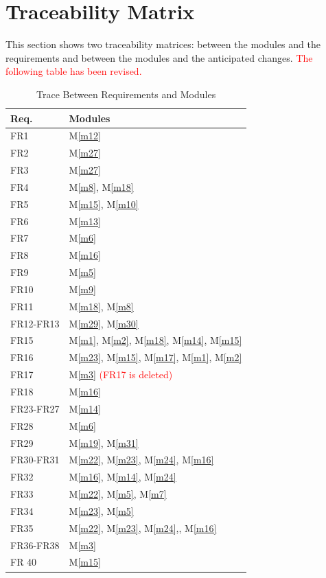\documentclass[12pt]{article}
\newcommand{\mref}[1]{M\ref{#1}}
\begin{document}
\newpage
\section{Traceability Matrix} \label{SecTM}
This section shows two traceability matrices: between the modules and the
requirements and between the modules and the anticipated changes.
\textcolor{red}{The following table has been revised.}
\begin{table}[H]
\centering
\begin{tabular}{p{} p{}}
\toprule
\textbf{Req.} & \textbf{Modules}\\
\midrule
FR1 & \mref{m12}\\
FR2 & \mref{m27}\\
FR3 & \mref{m27}\\
FR4 & \mref{m8}, \mref{m18}\\
FR5 & \mref{m15}, \mref{m10}\\
FR6 & \mref{m13}\\
FR7 & \mref{m6}\\
FR8 & \mref{m16}\\
FR9 & \mref{m5}\\
FR10 & \mref{m9}\\
FR11 & \mref{m18}, \mref{m8}\\
FR12-FR13 & \mref{m29}, \mref{m30}\\
FR15 & \mref{m1}, \mref{m2}, \mref{m18}, \mref{m14}, \mref{m15}\\
FR16 & \mref{m23}, \mref{m15}, \mref{m17}, \mref{m1}, \mref{m2}\\
FR17 & \mref{m3} \textcolor{red}{(FR17 is deleted)}\\
FR18 & \mref{m16}\\
FR23-FR27 & \mref{m14}\\
FR28 & \mref{m6}\\
FR29 & \mref{m19}, \mref{m31}\\
FR30-FR31 & \mref{m22}, \mref{m23}, \mref{m24}, \mref{m16}\\
FR32 & \mref{m16}, \mref{m14}, \mref{m24}\\
FR33 & \mref{m22}, \mref{m5}, \mref{m7}\\
FR34 & \mref{m23}, \mref{m5}\\
FR35 & \mref{m22}, \mref{m23}, \mref{m24},, \mref{m16}\\
FR36-FR38 & \mref{m3}\\
FR 40 & \mref{m15}\\

\bottomrule
\end{tabular}
\caption{Trace Between Requirements and Modules}
\label{TblRT}
\end{table}
\end{document}
